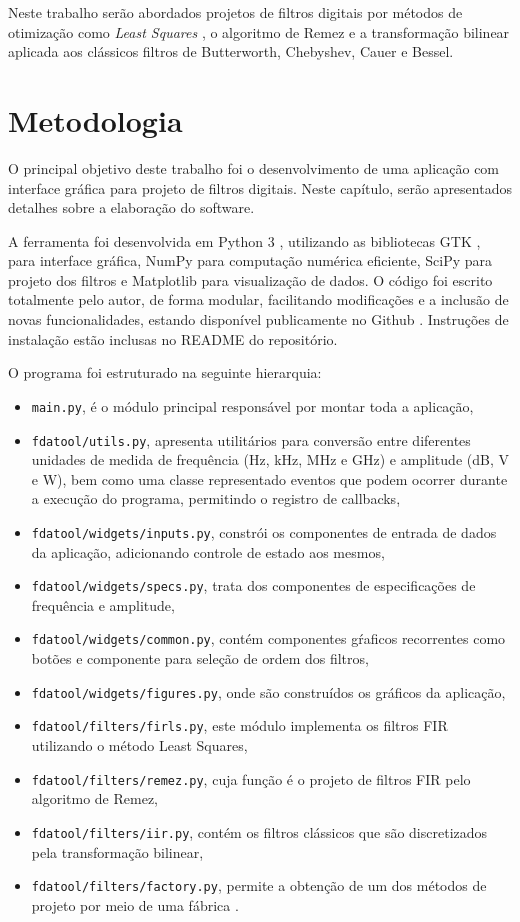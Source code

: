 \documentclass[12pt,a4paper]{report}
\begin{document}
  Neste trabalho serão abordados projetos de filtros digitais por métodos de otimização como
  \textit{Least Squares} \cite{selesnick}, o algoritmo de Remez \cite{mcclellan_parks} e a transformação bilinear
  \cite{diniz} aplicada aos clássicos filtros de Butterworth, Chebyshev, Cauer e Bessel.
\chapter{Metodologia}
  O principal objetivo deste trabalho foi o desenvolvimento de uma aplicação com interface gráfica para projeto
  de filtros digitais. Neste capítulo, serão apresentados detalhes sobre a elaboração do software.

  A ferramenta foi desenvolvida em Python 3 \cite{python}, utilizando as bibliotecas GTK \cite{gtk, pygtk}, para
  interface gráfica, NumPy \cite{numpy} para computação numérica eficiente, SciPy \cite{scipy} para projeto dos
  filtros e Matplotlib \cite{matplotlib} para visualização de dados.
  O código foi escrito totalmente pelo autor, de forma modular, facilitando modificações e a inclusão de novas
  funcionalidades, estando disponível publicamente no Github \cite{source_code}. Instruções de instalação estão
  inclusas no README do repositório.

  O programa foi estruturado na seguinte hierarquia:
  \begin{itemize}
    \item \texttt{main.py}, é o módulo principal responsável por montar toda a aplicação,
    \item \texttt{fdatool/utils.py}, apresenta utilitários para conversão entre diferentes unidades de medida de
      frequência (Hz, kHz, MHz e GHz) e amplitude (dB, V e W), bem como uma classe representado eventos que podem
      ocorrer durante a execução do programa, permitindo o registro de callbacks,
    \item \texttt{fdatool/widgets/inputs.py}, constrói os componentes de entrada de dados da aplicação,
      adicionando controle de estado aos mesmos,
    \item \texttt{fdatool/widgets/specs.py}, trata dos componentes de especificações de frequência e amplitude,
    \item \texttt{fdatool/widgets/common.py}, contém componentes gŕaficos recorrentes como botões e componente
      para seleção de ordem dos filtros,
    \item \texttt{fdatool/widgets/figures.py}, onde são construídos os gráficos da aplicação,
    \item \texttt{fdatool/filters/firls.py}, este módulo implementa os filtros FIR utilizando o método Least
      Squares,
    \item \texttt{fdatool/filters/remez.py}, cuja função é o projeto de filtros FIR pelo algoritmo de Remez,
    \item \texttt{fdatool/filters/iir.py}, contém os filtros clássicos que são discretizados pela transformação
      bilinear,
    \item \texttt{fdatool/filters/factory.py}, permite a obtenção de um dos métodos de projeto por meio de uma
      fábrica \cite{gang_of_four}.
  \end{itemize}
\end{document}
